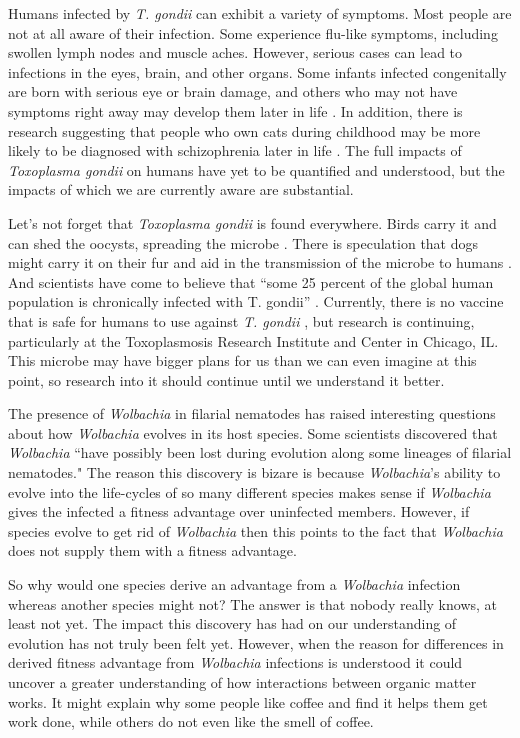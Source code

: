 \documentclass[twocolumn]{article}
\begin{document}
Humans infected by \textit{T. gondii} can exhibit a variety of symptoms. Most people are not at all aware of their infection. Some experience flu-like symptoms, including swollen lymph nodes and muscle aches. However, serious cases can lead to infections in the eyes, brain, and other organs. Some infants infected congenitally are born with serious eye or brain damage, and others who may not have symptoms right away may develop them later in life \cite{Tsymptoms}. In addition, there is research suggesting that people who own cats during childhood may be more likely to be diagnosed with schizophrenia later in life \cite{Tschiz}. The full impacts of \textit{Toxoplasma gondii} on humans have yet to be quantified and understood, but the impacts of which we are currently aware are substantial.

Let’s not forget that \textit{Toxoplasma gondii} is found everywhere. Birds carry it and can shed the oocysts, spreading the microbe \cite{Tbirds}. There is speculation that dogs might carry it on their fur and aid in the transmission of the microbe to humans \cite{Tdogs}. And scientists have come to believe that ``some 25 percent of the global human population is chronically infected with T. gondii” \cite{TUSDA}. Currently, there is no vaccine that is safe for humans to use against \textit{T. gondii} \cite{Tvaccine}, but research is continuing, particularly at the Toxoplasmosis Research Institute and Center in Chicago, IL. This microbe may have bigger plans for us than we can even imagine at this point, so research into it should continue until we understand it better.

The presence of \textit{Wolbachia} in filarial nematodes has raised interesting questions about how \textit{Wolbachia} evolves in its host species. Some scientists discovered that \textit{Wolbachia} ``have possibly been lost during evolution along some lineages of filarial nematodes."\cite{Wevolution_loss} The reason this discovery is bizare is because \textit{Wolbachia}'s ability to evolve into the life-cycles of so many different species makes sense if \textit{Wolbachia} gives the infected a fitness advantage over uninfected members. However, if species evolve to get rid of \textit{Wolbachia} then this points to the fact that \textit{Wolbachia} does not supply them with a fitness advantage.

So why would one species derive an advantage from a \textit{Wolbachia} infection whereas another species might not? The answer is that nobody really knows, at least not yet. The impact this discovery has had on our understanding of evolution has not truly been felt yet. However, when the reason for differences in derived fitness advantage from \textit{Wolbachia} infections is understood it could uncover a greater understanding of how interactions between organic matter works. It might explain why some people like coffee and find it helps them get work done, while others do not even like the smell of coffee.
\end{document}
